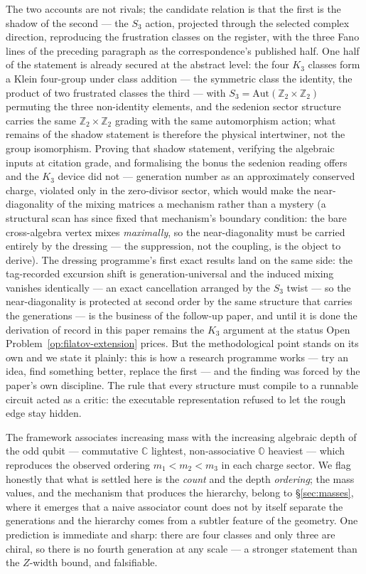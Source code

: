 The two accounts are not rivals; the candidate relation is that the first is the shadow of the
second --- the $S_{3}$ action, projected through the selected complex direction, reproducing the
frustration classes on the register, with the three Fano lines of the preceding paragraph as the
correspondence's published half. One half of the statement is already secured at the abstract
level: the four $K_{3}$ classes form a Klein four-group under class addition --- the symmetric
class the identity, the product of two frustrated classes the third --- with
$S_{3} = \mathrm{Aut}(\mathbb{Z}_{2} \times \mathbb{Z}_{2})$ permuting the three non-identity
elements, and the sedenion sector structure carries the same
$\mathbb{Z}_{2} \times \mathbb{Z}_{2}$ grading with the same automorphism action; what remains
of the shadow statement is therefore the physical intertwiner, not the group isomorphism. Proving that shadow statement, verifying the algebraic inputs at
citation grade, and formalising the bonus the sedenion reading offers and the $K_{3}$ device did
not --- generation number as an approximately conserved charge, violated only in the zero-divisor
sector, which would make the near-diagonality of the mixing matrices a mechanism rather than a
mystery (a structural scan has since fixed that mechanism's boundary condition: the bare
cross-algebra vertex mixes \emph{maximally}, so the near-diagonality must be carried entirely by
the dressing --- the suppression, not the coupling, is the object to derive). The dressing
programme's first exact results land on the same side: the tag-recorded excursion shift is
generation-universal and the induced mixing vanishes identically --- an exact cancellation
arranged by the $S_3$ twist --- so the near-diagonality is protected at second order by the
same structure that carries the generations --- is the business of the follow-up paper, and until it is done the derivation of record
in this paper remains the $K_{3}$ argument at the status Open Problem~\ref{op:filatov-extension}
prices. But the methodological point stands on its own and we state it plainly: this is how a
research programme works --- try an idea, find something better, replace the first --- and the
finding was forced by the paper's own discipline. The rule that every structure must compile to a
runnable circuit acted as a critic: the executable representation refused to let the rough edge
stay hidden.

The framework associates increasing mass with the increasing algebraic depth of the odd qubit ---
commutative $\mathbb{C}$ lightest, non-associative $\mathbb{O}$ heaviest --- which reproduces the
observed ordering $m_1 < m_2 < m_3$ in each charge sector. We flag honestly that what is settled here
is the \emph{count} and the depth \emph{ordering}; the mass values, and the mechanism that produces
the hierarchy, belong to \S\ref{sec:masses}, where it emerges that a naive associator count does not
by itself separate the generations and the hierarchy comes from a subtler feature of the geometry.
One prediction is immediate and sharp: there are four classes and only three are chiral, so there is
no fourth generation at any scale --- a stronger statement than the $Z$-width bound, and falsifiable.

